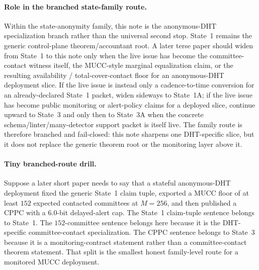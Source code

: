 \documentclass[11pt]{article}
\begin{document}
\paragraph{Role in the branched state-family route.}
Within the state-anonymity family, this note is the anonymous-DHT specialization branch rather than the universal second stop.  State~1 remains the generic control-plane theorem/accountant root.  A later terse paper should widen from State~1 to this note only when the live issue has become the committee-contact witness itself, the MUCC-style marginal equalization claim, or the resulting availability / total-cover-contact floor for an anonymous-DHT deployment slice.  If the live issue is instead only a cadence-to-time conversion for an already-declared State~1 packet, widen sideways to State~1A; if the live issue has become public monitoring or alert-policy claims for a deployed slice, continue upward to State~3 and only then to State~3A when the concrete schema/linter/many-detector support packet is itself live.  The family route is therefore branched and fail-closed: this note sharpens one DHT-specific slice, but it does not replace the generic theorem root or the monitoring layer above it.\cite{series:state1,series:state1addendum,series:state3,series:state3addendum}

\paragraph{Tiny branched-route drill.}
Suppose a later short paper needs to say that a stateful anonymous-DHT deployment fixed the generic State~1 claim tuple, exported a MUCC floor of at least $152$ expected contacted committees at $M=256$, and then published a CPPC with a $6.0$-bit delayed-alert cap.  The State~1 claim-tuple sentence belongs to State~1.  The $152$-committee sentence belongs here because it is the DHT-specific committee-contact specialization.  The CPPC sentence belongs to State~3 because it is a monitoring-contract statement rather than a committee-contact theorem statement.  That split is the smallest honest family-level route for a monitored MUCC deployment.\cite{series:state1,series:state3}
\end{document}
